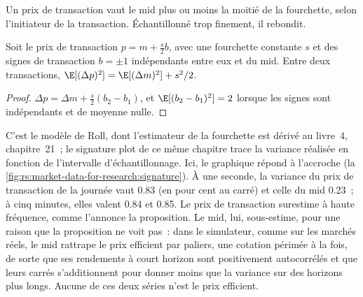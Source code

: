 Un prix de transaction vaut le mid plus ou moins la moitié de la fourchette, selon l'initiateur de la transaction. Échantillonné trop finement, il rebondit.

\begin{proposition}\label{prop:rs:market-data-for-research:bounce}
Soit le prix de transaction $p = m + \tfrac s2 b$, avec une fourchette constante $s$ et des signes de transaction $b = \pm1$ indépendants entre eux et
du mid. Entre deux transactions, $\E[(\Delta p)^2] = \E[(\Delta m)^2] + s^2/2$.
\end{proposition}

\begin{proof}
$\Delta p = \Delta m + \tfrac s2(b_2 - b_1)$, et $\E[(b_2 - b_1)^2] = 2$ lorsque les signes sont indépendants et de moyenne nulle.
\end{proof}

C'est le modèle de Roll, dont l'estimateur de la fourchette est dérivé au livre~4, chapitre~21~; le signature plot de ce même chapitre trace la
variance réalisée en fonction de l'intervalle d'échantillonnage. Ici, le graphique répond à l'accroche
(la \cref{fig:rs:market-data-for-research:signature}). À une seconde, la variance du prix de transaction de la journée vaut 0.83 (en pour cent au
carré) et celle du mid 0.23~; à cinq minutes, elles valent 0.84 et 0.85. Le prix de transaction surestime à haute fréquence, comme l'annonce la
proposition. Le mid, lui, sous-estime, pour une raison que la proposition ne voit pas~: dans le simulateur, comme sur les marchés réels, le mid
rattrape le prix efficient par paliers, une cotation périmée à la fois, de sorte que ses rendements à court horizon sont positivement
autocorrélés et que leurs carrés s'additionnent pour donner moins que la variance sur des horizons plus longs. Aucune de ces deux séries n'est le prix efficient.

